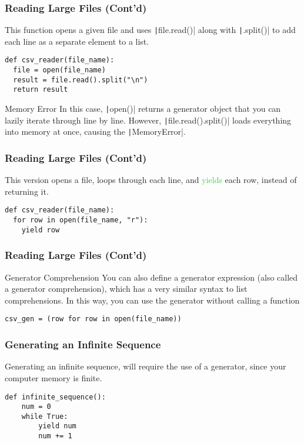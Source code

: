 \documentclass{../py-lecture}
\begin{document}
\begin{frame}[fragile]
  \frametitle{Reading Large Files (Cont'd)}
  \begin{block}{}
  This function opens a given file and uses \texttt|file.read()| along with \texttt|.split()|
  to add each line as a separate element to a list.
  \end{block}
  \begin{verbatim}
def csv_reader(file_name):
  file = open(file_name)
  result = file.read().split("\n")
  return result
  \end{verbatim}
  \begin{block}{Memory Error}
    In this case, \texttt|open()| returns a generator object that you can lazily iterate through line by line.
    However, \texttt|file.read().split()| loads everything into memory at once, causing the \texttt|MemoryError|.
  \end{block}
\end{frame}

\begin{frame}[fragile]
  \frametitle{Reading Large Files (Cont'd)}
  \begin{block}{}
    This version opens a file, loops through each line, and \textcolor{LimeGreen}{yields} each row, instead of returning it.
  \end{block}
  \begin{verbatim}
def csv_reader(file_name):
  for row in open(file_name, "r"):
    yield row
  \end{verbatim}
\end{frame}

\begin{frame}[fragile]
  \frametitle{Reading Large Files (Cont'd)}
  \begin{block}{Generator Comprehension}
  You can also define a generator expression (also called a generator comprehension), which has a very similar syntax to list comprehensions. In this way, you can use the generator without calling a function
  \end{block}
  \begin{verbatim}
csv_gen = (row for row in open(file_name))
  \end{verbatim}
\end{frame}

\begin{frame}[fragile]
  \frametitle{Generating an Infinite Sequence}
  \begin{block}{}
    Generating an infinite sequence, will require the use of a generator, since your computer memory is finite.
  \end{block}
  \begin{verbatim}
def infinite_sequence():
    num = 0
    while True:
        yield num
        num += 1
  \end{verbatim}
\end{frame}
\end{document}
